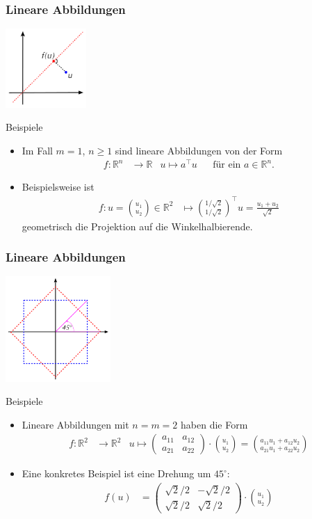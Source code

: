 \documentclass{beamer}
\newcommand\RR{\mathbb R}
\newcommand{\trans}{\top}
\newcommand{\ue}{\"u}
\newcommand{\mytitle}{Lineare Abbildungen}
\begin{document}
\begin{frame}\frametitle{\mytitle}
	\hfill\includegraphics[height=30mm]{pics/linear2d.pdf}
	\begin{block}{Beispiele}
	\begin{itemize}
	\item Im Fall $m=1$, $n\geq1$ sind lineare Abbildungen von der Form
		\begin{align*}
			f:\RR^n&\to\RR&u\mapsto a^\trans u&&\mbox{f\ue r ein }a\in\RR^n.
		\end{align*}
	\item Beispielsweise ist 
		\begin{align*}
			f:u=\binom{u_1}{u_2}\in\RR^2&\mapsto\binom{1/\sqrt 2}{1/\sqrt 2}^\trans u=\frac{u_1+u_2}{\sqrt 2}
		\end{align*}
		geometrisch die Projektion auf die Winkelhalbierende.
	\end{itemize}
	\end{block}
\end{frame}

\begin{frame}\frametitle{\mytitle}
	\vspace{-8mm}
	\hfill\includegraphics[height=40mm]{pics/rotation.pdf}
	\begin{block}{Beispiele}
	\begin{itemize}
	\item Lineare Abbildungen mit $n=m=2$ haben die Form
		\begin{align*}
			f:\RR^2&\to\RR^2&u\mapsto \begin{pmatrix}a_{11}&a_{12}\\a_{21}&a_{22}\end{pmatrix}\cdot\binom{u_1}{u_2}=\binom{a_{11}u_1+a_{12}u_2}{a_{21}u_1+a_{22}u_2}
		\end{align*}
	\item Eine konkretes Beispiel ist eine Drehung um $45^\circ$:  
		\begin{align*}
			f(u)&=\begin{pmatrix}\sqrt 2/2&-\sqrt 2/2\\\sqrt 2/2&\sqrt 2/2\end{pmatrix}\cdot\binom{u_1}{u_2}
		\end{align*}
	\end{itemize}
	\end{block}
\end{frame}
\end{document}
